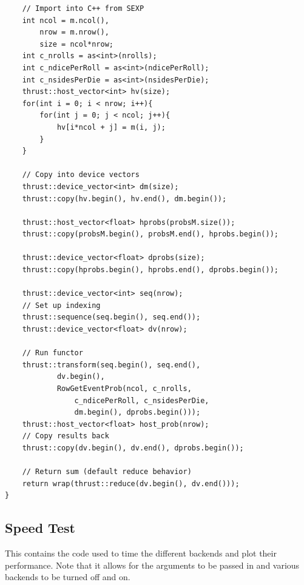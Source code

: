 \documentclass[12pt]{article}
\begin{document}
\begin{lstlisting}
    // Import into C++ from SEXP
    int ncol = m.ncol(),
        nrow = m.nrow(),
        size = ncol*nrow;
    int c_nrolls = as<int>(nrolls);
    int c_ndicePerRoll = as<int>(ndicePerRoll);
    int c_nsidesPerDie = as<int>(nsidesPerDie);
    thrust::host_vector<int> hv(size);
    for(int i = 0; i < nrow; i++){
        for(int j = 0; j < ncol; j++){
            hv[i*ncol + j] = m(i, j);
        }
    }

    // Copy into device vectors
    thrust::device_vector<int> dm(size);
    thrust::copy(hv.begin(), hv.end(), dm.begin());

    thrust::host_vector<float> hprobs(probsM.size());
    thrust::copy(probsM.begin(), probsM.end(), hprobs.begin());

    thrust::device_vector<float> dprobs(size);
    thrust::copy(hprobs.begin(), hprobs.end(), dprobs.begin());

    thrust::device_vector<int> seq(nrow);
    // Set up indexing
    thrust::sequence(seq.begin(), seq.end());
    thrust::device_vector<float> dv(nrow);

    // Run functor
    thrust::transform(seq.begin(), seq.end(),
            dv.begin(),
            RowGetEventProb(ncol, c_nrolls, 
                c_ndicePerRoll, c_nsidesPerDie, 
                dm.begin(), dprobs.begin()));
    thrust::host_vector<float> host_prob(nrow);
    // Copy results back
    thrust::copy(dv.begin(), dv.end(), dprobs.begin());
    
    // Return sum (default reduce behavior)
    return wrap(thrust::reduce(dv.begin(), dv.end()));
}
\end{lstlisting}
\subsection{Speed Test}

This contains the code used to time the different backends and plot their performance. Note that it allows for the arguments to be passed in and various backends to be turned off and on.
\end{document}
